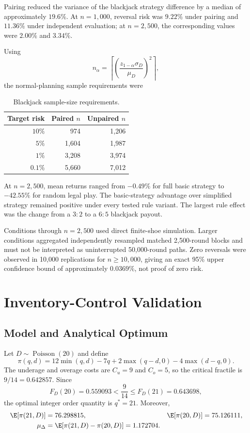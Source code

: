 Pairing reduced the variance of the blackjack strategy difference by a median
of approximately $19.6\%$. At $n=1{,}000$, reversal risk was $9.22\%$ under
pairing and $11.36\%$ under independent evaluation; at $n=2{,}500$, the
corresponding values were $2.00\%$ and $3.34\%$.

Using
\begin{equation}
n_\alpha=\left\lceil\left(\frac{z_{1-\alpha}\sigma_D}{\mu_D}\right)^2\right\rceil,
\end{equation}
the normal-planning sample requirements were
\begin{table}[H]
\centering
\caption{Blackjack sample-size requirements.}
\begin{tabular}{rrr}
\toprule
Target risk & Paired $n$ & Unpaired $n$ \\
\midrule
$10\%$  &   974 & 1,206 \\
$ 5\%$  & 1,604 & 1,987 \\
$ 1\%$  & 3,208 & 3,974 \\
$0.1\%$ & 5,660 & 7,012 \\
\bottomrule
\end{tabular}
\end{table}

At $n=2{,}500$, mean returns ranged from $-0.49\%$ for full basic strategy to
$-42.55\%$ for random legal play. The basic-strategy advantage over simplified
strategy remained positive under every tested rule variant. The largest rule
effect was the change from a $3{:}2$ to a $6{:}5$ blackjack payout.

Conditions through $n=2{,}500$ used direct finite-shoe simulation. Larger
conditions aggregated independently resampled matched 2,500-round blocks and
must not be interpreted as uninterrupted 50,000-round paths. Zero reversals
were observed in 10,000 replications for $n\geq10{,}000$, giving an exact 95\%
upper confidence bound of approximately $0.0369\%$, not proof of zero risk.

\newpage

\section{Inventory-Control Validation}

\subsection{Model and Analytical Optimum}

Let $D\sim\operatorname{Poisson}(20)$ and define
\begin{equation}
\pi(q,d)=12\min(q,d)-7q+2\max(q-d,0)-4\max(d-q,0).
\end{equation}
The underage and overage costs are $C_u=9$ and $C_o=5$, so the critical
fractile is $9/14=0.642857$. Since
\begin{equation}
F_D(20)=0.559093<\frac{9}{14}\leq F_D(21)=0.643698,
\end{equation}
the optimal integer order quantity is $q^*=21$. Moreover,
\begin{align}
\E[\pi(21,D)]&=76.298815, & \E[\pi(20,D)]&=75.126111,\\
\mu_\Delta&=\E[\pi(21,D)-\pi(20,D)]=1.172704.
\end{align}

